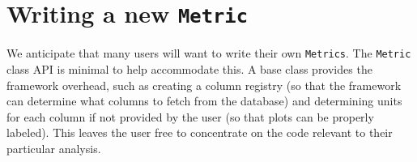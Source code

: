 \documentclass[]{spie}  %
\begin{document}

\section{Writing a new {\tt Metric}}
\label{sec:MetricAPI}

We anticipate that many users will want to write their own {\tt Metrics}.
The {\tt Metric} class API is minimal to help accommodate
this. A base class provides the framework overhead, such as creating a
column registry (so that the framework can determine what columns to
fetch from the database) and determining units for each column if not
provided by the user (so that plots can be properly labeled). This
leaves the user free to concentrate on the code relevant to their
particular analysis.
\end{document}
